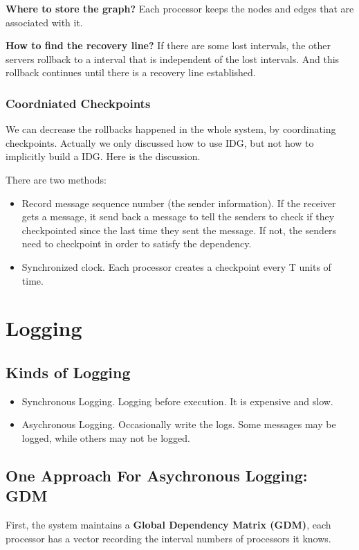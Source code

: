 \textbf{Where to store the graph?} Each processor keeps the nodes and edges that are associated with it.

\textbf{How to find the recovery line?} If there are some lost intervals, the other servers rollback to a interval that is independent of the lost intervals. And this rollback continues until there is a recovery line established.

\subsubsection{Coordniated Checkpoints}
We can decrease the rollbacks happened in the whole system, by coordinating checkpoints. Actually we only discussed how to use IDG, but not how to implicitly build a IDG. Here is the discussion.

There are two methods:
\begin{itemize}
    \item Record message sequence number (the sender information). If the receiver gets a message, it send back a message to tell the senders to check if they checkpointed since the last time they sent the message. If not, the senders need to checkpoint in order to satisfy the dependency.
    \item Synchronized clock. Each processor creates a checkpoint every T units of time.
\end{itemize}

\section{Logging}

\subsection{Kinds of Logging}

\begin{itemize}
    \item Synchronous Logging. Logging before execution. It is expensive and slow.
    \item Asychronous Logging. Occasionally write the logs. Some messages may be logged, while others may not be logged.
\end{itemize}

\subsection{One Approach For Asychronous Logging: GDM}
First, the system maintains a \textbf{Global Dependency Matrix (GDM)}, each processor has a vector recording the interval numbers of processors it knows. 

